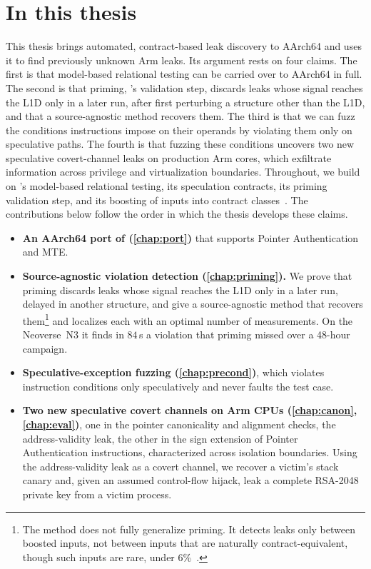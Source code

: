 \section{In this thesis}
\label{sec:intro-contributions}

This thesis brings automated, contract-based leak discovery to AArch64 and uses it to find
previously unknown Arm leaks. Its argument rests on four claims. The first is that model-based
relational testing can be carried over to AArch64 in full. The second is that priming,
\revizor{}'s validation step, discards leaks whose signal reaches the L1D only in a later run,
after first perturbing a structure other than the L1D, and that a source-agnostic method
recovers them. The third is that we can fuzz the conditions instructions impose on their
operands by violating them only on speculative paths. The fourth is that fuzzing these
conditions uncovers two new speculative covert-channel leaks on production Arm cores, which
exfiltrate information across privilege and virtualization boundaries. Throughout, we build on
\revizor{}'s model-based relational testing, its speculation contracts, its priming validation step,
and its boosting of inputs into contract classes~\cite{revizor,hide_seek}. The contributions below
follow the order in which the thesis develops these claims.

\begin{itemize}
\item \textbf{An AArch64 port of \revizor{} (\autoref{chap:port})} that supports Pointer
  Authentication and MTE.

\item \textbf{Source-agnostic violation detection (\autoref{chap:priming}).} We prove that
  priming discards leaks whose signal reaches the L1D only in a later run, delayed in another
  structure, and give a source-agnostic method that recovers them\footnote{The method does not
  fully generalize priming. It detects leaks only between boosted inputs, not between inputs that
  are naturally contract-equivalent, though such inputs are rare, under 6\%~\cite{hide_seek}.}
  and localizes each with an optimal number of measurements. On the Neoverse~N3 it finds in
  $84$\,s a violation that priming missed over a 48-hour campaign.

\item \textbf{Speculative-exception fuzzing (\autoref{chap:precond})}, which violates
  instruction conditions only speculatively and never faults the test case.

\item \textbf{Two new speculative covert channels on Arm CPUs (\autoref{chap:canon},
  \autoref{chap:eval})}, one in the pointer canonicality and alignment checks, the address-validity
  leak, the other in the sign extension of Pointer Authentication instructions, characterized
  across isolation boundaries. Using the address-validity leak as a covert channel, we recover a
  victim's stack canary and, given an assumed control-flow hijack, leak a complete RSA-2048 private
  key from a victim process.
\end{itemize}


